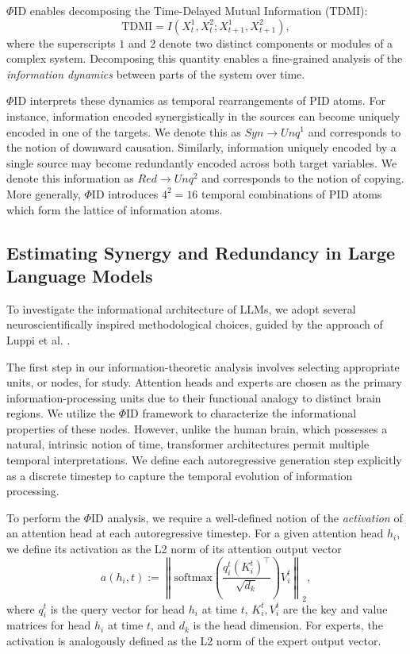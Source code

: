 \documentclass[11pt,a4paper]{ouparticle}
\begin{document}
$\Phi$ID enables decomposing the Time-Delayed Mutual Information (TDMI):
\begin{equation*}
    \text{TDMI} = I(X_t^1, X_t^2; X_{t+1}^1, X_{t+1}^2),
\end{equation*}
where the superscripts $1$ and $2$ denote two distinct components or modules of a complex system. Decomposing this quantity enables a fine-grained analysis of the \textit{information dynamics} between parts of the system over time.

$\Phi$ID interprets these dynamics as temporal rearrangements of PID atoms. For instance, information encoded synergistically in the sources can become uniquely encoded in one of the targets. We denote this as $Syn\rightarrow Unq^1$ and corresponds to the notion of downward causation. Similarly, information uniquely encoded by a single source may become redundantly encoded across both target variables. We denote this information as $Red\rightarrow Unq^2$ and corresponds to the notion of copying. More generally, $\Phi$ID introduces $4^2=16$ temporal combinations of PID atoms which form the lattice of information atoms.%


\subsection*{Estimating Synergy and Redundancy in Large Language Models}

To investigate the informational architecture of LLMs, we adopt several neuroscientifically inspired methodological choices, guided by the approach of Luppi et al. \cite{luppi2022synergistic}.

The first step in our information-theoretic analysis involves selecting appropriate units, or nodes, for study. Attention heads and experts are chosen as the primary information-processing units due to their functional analogy to distinct brain regions. We utilize the $\Phi$ID framework to characterize the informational properties of these nodes. However, unlike the human brain, which possesses a natural, intrinsic notion of time, transformer architectures permit multiple temporal interpretations. We define each autoregressive generation step explicitly as a discrete timestep to capture the temporal evolution of information processing.

To perform the $\Phi$ID analysis, we require a well-defined notion of the \textit{activation} of an attention head at each autoregressive timestep. For a given attention head $h_i$, we define its activation as the L2 norm of its attention output vector
\begin{equation*}
    a(h_i, t) := \left\| \text{softmax}\left(\frac{q_i^t (K_i^t)^\top}{\sqrt{d_k}}\right) V_i^t \right\|_2,
\end{equation*}
where $q_i^t$ is the query vector for head $h_i$ at time $t$, $K_i^t, V_i^t$ are the key and value matrices for head $h_i$ at time $t$, and $d_k$ is the head dimension. For experts, the activation is analogously defined as the L2 norm of the expert output vector.
\end{document}
